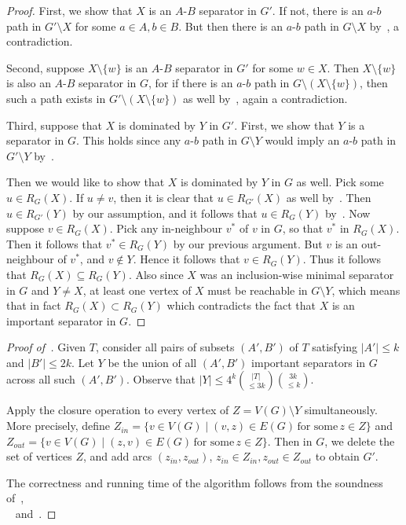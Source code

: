 \documentclass[11pt]{article}
\begin{document}
{\begin{proof}
First, we show that $X$ is an $A$-$B$ separator in $G'$. If not, there is an $a$-$b$ path in $G' \setminus X$ for some $a \in A, b \in B$. But then there is an $a$-$b$ path in $G \setminus X$ by~, a contradiction.


Second, suppose $X \setminus \{w\}$ is an $A$-$B$ separator in $G'$ for some $w \in X$. Then $X \setminus \{w\}$ is also an $A$-$B$ separator in $G$, for if there is an $a$-$b$ path in $G \setminus (X \setminus \{w\})$, then such a path exists in $G' \setminus (X \setminus \{w\})$ as well by~, again a contradiction.

Third, suppose that $X$ is dominated by $Y$ in $G'$. First, we show that $Y$ is a separator in $G$. This holds since any $a$-$b$ path in $G \setminus Y$ would imply an $a$-$b$ path in $G' \setminus Y$ by~.


Then we would like to show that $X$ is dominated by $Y$ in $G$ as well. Pick some $u \in R_G(X)$. If $u \neq v$, then it is clear that $u \in R_{G'}(X)$ as well by~. Then $u \in R_{G'}(Y)$ by our assumption, and it follows that $u \in R_G(Y)$ by~. Now suppose $v \in R_G(X)$. Pick any in-neighbour $v^*$ of $v$ in $G$, so that $v^*$ in $R_G(X)$. Then it follows that $v^* \in R_{G}(Y)$ by our previous argument. But $v$ is an out-neighbour of $v^*$, and $v \notin Y$. Hence it follows that $v \in R_G(Y)$. Thus it follows that $R_G(X) \subseteq R_G(Y)$. Also since $X$ was an inclusion-wise minimal separator in $G$ and $Y \neq X$, at least one vertex of $X$ must be reachable in $G \setminus Y$, which means that in fact $R_G(X) \subset R_G(Y)$ which contradicts the fact that $X$ is an important separator in $G$.
\end{proof}






\begin{proof}[Proof of~]
Given $T$, consider all pairs of subsets $(A',B')$ of $T$ satisfying $|A'| \leq k$ and $|B'| \leq 2k$. Let $Y$ be the union of all $(A',B')$ important separators in $G$ across all such $(A',B')$. Observe that $|Y| \leq 4^k {|T| \choose \leq 3k} {3k \choose \leq k}$. 

Apply the closure operation to every vertex of $ Z = V(G) \setminus Y$ simultaneously. More precisely, define $Z_{in} = \{v \in V(G) \mid (v,z) \in E(G)\,\text{for some}\,z \in Z\}$ and $Z_{out} = \{v \in V(G) \mid (z,v) \in E(G)\,\text{for some}\,z \in Z\}$. Then in $G$, we delete the set of vertices $Z$, and add arcs $(z_{in}, z_{out})$, $z_{in} \in Z_{in}, z_{out} \in Z_{out}$ to obtain $G'$.


The correctness and running time of the algorithm follows from the soundness of~,\\~ and~.
\end{proof}
}
 
\end{document}
